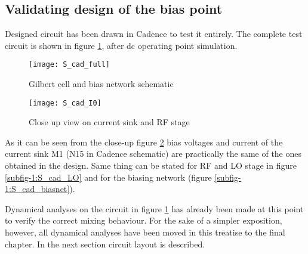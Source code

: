 \subsection{Validating design of the bias point}
Designed circuit has been drawn in Cadence to test it entirely. The complete test circuit is shown in figure \ref{S_cad_full}, after dc operating point simulation.
\begin{figure}[H]
	\centering
	\texttt{[image: S\_cad\_full]}
	\caption{Gilbert cell and bias network schematic}
	\label{S_cad_full}
\end{figure}

\begin{figure}[H]
	\centering
	\texttt{[image: S\_cad\_I0]}
	\caption{Close up view on current sink and RF stage}
	\label{S_cad_I0}
\end{figure}
As it can be seen from the close-up figure \ref{S_cad_I0} bias voltages and current of the current sink M1 (N15 in Cadence schematic) are practically the same of the ones obtained in the design. Same thing can be stated for RF and LO stage in figure \ref{subfig-1:S_cad_LO} and for the biasing network (figure \ref{subfig-1:S_cad_biasnet}).
\begin{figure}[H]
	\centering
	\hfill
	\caption{}
\end{figure}

Dynamical analyses on the circuit in figure \ref{S_cad_full} has already been made at this point to verify the correct mixing behaviour. For the sake of a simpler exposition, however, all dynamical analyses have been moved in this treatise to the final chapter. In the next section circuit layout is described. 